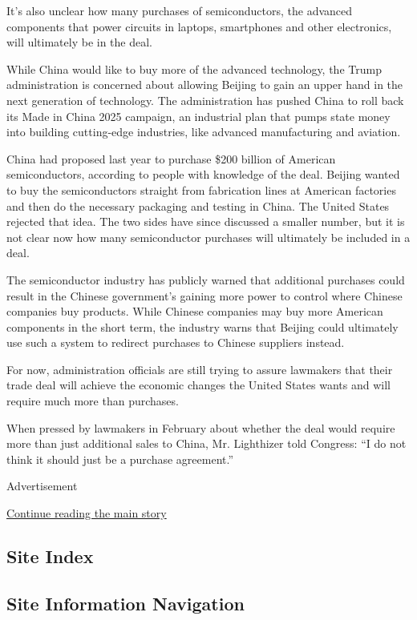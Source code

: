 It's also unclear how many purchases of semiconductors, the advanced
components that power circuits in laptops, smartphones and other
electronics, will ultimately be in the deal.

While China would like to buy more of the advanced technology, the Trump
administration is concerned about allowing Beijing to gain an upper hand
in the next generation of technology. The administration has pushed
China to roll back its Made in China 2025 campaign, an industrial plan
that pumps state money into building cutting-edge industries, like
advanced manufacturing and aviation.

China had proposed last year to purchase \$200 billion of American
semiconductors, according to people with knowledge of the deal. Beijing
wanted to buy the semiconductors straight from fabrication lines at
American factories and then do the necessary packaging and testing in
China. The United States rejected that idea. The two sides have since
discussed a smaller number, but it is not clear now how many
semiconductor purchases will ultimately be included in a deal.

The semiconductor industry has publicly warned that additional purchases
could result in the Chinese government's gaining more power to control
where Chinese companies buy products. While Chinese companies may buy
more American components in the short term, the industry warns that
Beijing could ultimately use such a system to redirect purchases to
Chinese suppliers instead.

For now, administration officials are still trying to assure lawmakers
that their trade deal will achieve the economic changes the United
States wants and will require much more than purchases.

When pressed by lawmakers in February about whether the deal would
require more than just additional sales to China, Mr. Lighthizer told
Congress: ``I do not think it should just be a purchase agreement.''

Advertisement

\protect\hyperlink{after-bottom}{Continue reading the main story}

\hypertarget{site-index}{%
\subsection{Site Index}\label{site-index}}

\hypertarget{site-information-navigation}{%
\subsection{Site Information
Navigation}\label{site-information-navigation}}

